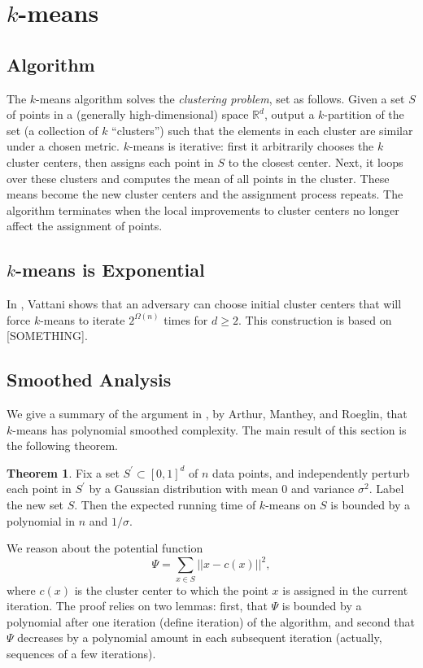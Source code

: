 \documentclass[11pt]{article}
\theoremstyle{definition}
\newtheorem{theorem}{Theorem}
\begin{document}

\section{$k$-means}
\subsection{Algorithm}
The $k$-means algorithm solves the \emph{clustering
  problem}, set as follows. Given a set $S$ of points in a (generally
high-dimensional) space $\mathbb{R}^d$, output a $k$-partition of the
set (a collection of $k$ ``clusters'') such that the elements in each
cluster are similar under a chosen metric. $k$-means is iterative:
first it arbitrarily chooses the $k$ cluster centers, then assigns each point in $S$ to the closest center. Next, it
loops over these clusters and computes the mean of all
points in the cluster. These means become the new cluster centers and
the assignment process repeats. The algorithm terminates when the
local improvements to cluster centers no longer affect the assignment
of points.

\subsection{$k$-means is Exponential}
In \cite{KMworstcase}, Vattani shows that an adversary can choose initial cluster centers that will force $k$-means to iterate $2^{\Omega(n)}$ times for $d \ge 2$. This construction is based on [SOMETHING].

\subsection{Smoothed Analysis}
We give a summary of the argument in \cite{SAkmeans}, by Arthur, Manthey, and Roeglin, that $k$-means has polynomial smoothed complexity. The main result of this section is the following theorem.
\begin{theorem}
Fix a set $S^{\prime} \subset [0,1]^d$ of $n$ data points, and independently perturb each point in $S^{\prime}$ by a Gaussian distribution with mean 0 and variance $\sigma^2$. Label the new set $S$. Then the expected running time of $k$-means on $S$ is bounded by a polynomial in $n$ and $1/\sigma$.
\end{theorem}
We reason about the potential function \begin{equation}
\Psi = \sum_{x \in S}||x - c(x)||^2,
\end{equation} where $c(x)$ is the cluster center to which the point $x$ is assigned in the current iteration. The proof relies on two lemmas: first, that $\Psi$ is bounded by a polynomial after one iteration (define iteration) of the algorithm, and second that $\Psi$ decreases by a polynomial amount in each subsequent iteration (actually, sequences of a few iterations).
\end{document}

